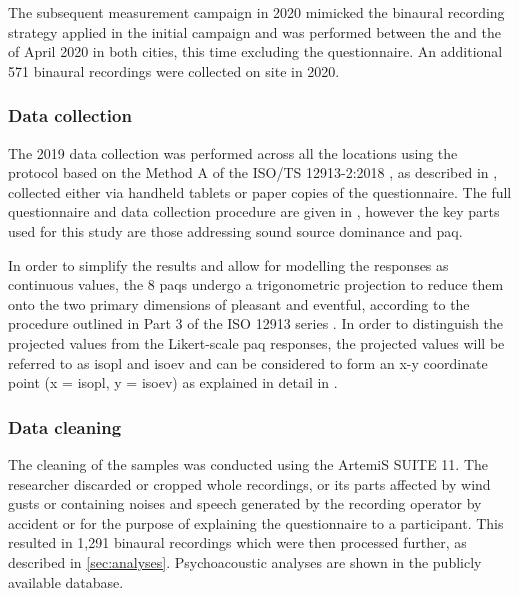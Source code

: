    The subsequent measurement campaign in 2020 mimicked the binaural recording strategy applied in the initial campaign and was performed between the  and the  of April 2020 in both cities, this time excluding the questionnaire. An additional 571 binaural recordings were collected on site in 2020.

   \subsubsection{Data collection}
   The 2019 data collection was performed across all the locations using the protocol based on the Method A of the ISO/TS 12913-2:2018 \citep{ISO12913Part2}, as described in \citep{Aletta2020Assessing,Mitchell2020Soundscape}, collected either via handheld tablets or paper copies of the questionnaire. The full questionnaire and data collection procedure are given in \citet{Mitchell2020Soundscape}, however the key parts used for this study are those addressing sound source dominance and \gls{paq}.

   In order to simplify the results and allow for modelling the responses as continuous values, the 8 \glspl{paq} undergo a trigonometric projection to reduce them onto the two primary dimensions of pleasant and eventful, according to the procedure outlined in Part 3 of the ISO 12913 series \citep{ISO12913Part3}. In order to distinguish the projected values from the Likert-scale \gls{paq} responses, the projected values will be referred to as \gls{isopl} and \gls{isoev} and can be considered to form an x-y coordinate point (x = \gls{isopl}, y = \gls{isoev}) as explained in detail in \citet{Lionello2021Introducing}.


   \subsubsection{Data cleaning}
   The cleaning of the samples was conducted using the ArtemiS SUITE 11. The researcher discarded or cropped whole recordings, or its parts affected by wind gusts or containing noises and speech generated by the recording operator by accident or for the purpose of explaining the questionnaire to a participant. This resulted in 1,291 binaural recordings which were then processed further, as described in \cref{sec:analyses}. Psychoacoustic analyses are shown in the publicly available database.

